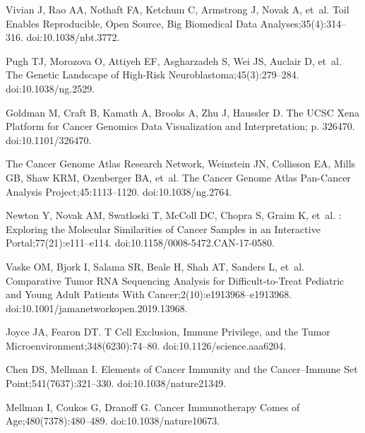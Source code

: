 \documentclass[10pt,letterpaper]{article}
\begin{document}
\begin{thebibliography}{10}
	
	Vivian J, Rao AA, Nothaft FA, Ketchum C, Armstrong J, Novak A, et~al.
	\newblock Toil Enables Reproducible, Open Source, Big Biomedical Data
	Analyses;35(4):314--316.
	\newblock doi:{10.1038/nbt.3772}.
	
	Pugh TJ, Morozova O, Attiyeh EF, Asgharzadeh S, Wei JS, Auclair D, et~al.
	\newblock The Genetic Landscape of High-Risk Neuroblastoma;45(3):279--284.
	\newblock doi:{10.1038/ng.2529}.
	
	Goldman M, Craft B, Kamath A, Brooks A, Zhu J, Haussler D.
	\newblock The {{UCSC Xena Platform}} for Cancer Genomics Data Visualization and
	Interpretation; p. 326470.
	\newblock doi:{10.1101/326470}.
	
	{The Cancer Genome Atlas Research Network}, Weinstein JN, Collisson EA, Mills
	GB, Shaw KRM, Ozenberger BA, et~al.
	\newblock The {{Cancer Genome Atlas Pan}}-{{Cancer}} Analysis
	Project;45:1113--1120.
	\newblock doi:{10.1038/ng.2764}.
	
	Newton Y, Novak AM, Swatloski T, McColl DC, Chopra S, Graim K, et~al.
	: {{Exploring}} the {{Molecular Similarities}} of
	{{Cancer Samples}} in an {{Interactive Portal}};77(21):e111--e114.
	\newblock doi:{10.1158/0008-5472.CAN-17-0580}.
	
	Vaske OM, Bjork I, Salama SR, Beale H, Shah AT, Sanders L, et~al.
	\newblock Comparative {{Tumor RNA Sequencing Analysis}} for
	{{Difficult}}-to-{{Treat Pediatric}} and {{Young Adult Patients With
			Cancer}};2(10):e1913968--e1913968.
	\newblock doi:{10.1001/jamanetworkopen.2019.13968}.
	
	Joyce JA, Fearon DT.
	\newblock T Cell Exclusion, Immune Privilege, and the Tumor
	Microenvironment;348(6230):74--80.
	\newblock doi:{10.1126/science.aaa6204}.
	
	Chen DS, Mellman I.
	\newblock Elements of Cancer Immunity and the Cancer–Immune Set
	Point;541(7637):321--330.
	\newblock doi:{10.1038/nature21349}.
	
	Mellman I, Coukos G, Dranoff G.
	\newblock Cancer Immunotherapy Comes of Age;480(7378):480--489.
	\newblock doi:{10.1038/nature10673}.
	

\end{thebibliography}
\end{document}
